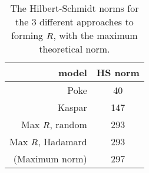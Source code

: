 \documentclass[a4paper]{article}
\begin{document}
\begin{table}
\begin{center}\begin{tabular}{r|c} \hline
   \textbf{model}             & \textbf{HS norm} \\ \hline
   Poke                       & 40 \\
   Kaspar                     & 147 \\
   Max $\mathnormal{R}$, random   & 293 \\
   Max $\mathnormal{R}$, Hadamard & 293 \\
   (Maximum norm)             & 297 \\ \hline 
\end{tabular}\end{center}
   \caption{The Hilbert-Schmidt norms for the 3 different approaches to
   forming $\mathnormal{R}$, with the maximum theoretical norm.
   \label{table:hsnorm}}
\end{table}
\end{document}
